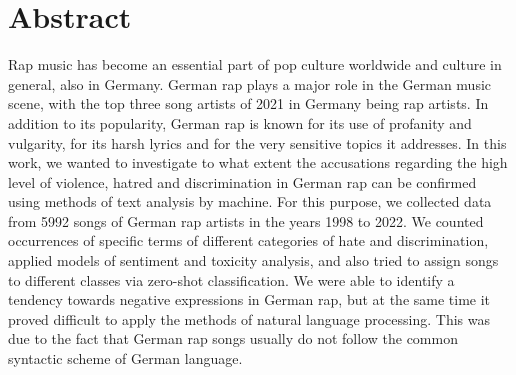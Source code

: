 \section*{Abstract}\label{sec:abstract}
Rap music has become an essential part of pop culture worldwide and culture in general, also in Germany. German rap plays a major role in the German music scene, with the top three song artists of 2021 in Germany being rap artists. In addition to its popularity, German rap is known for its use of profanity and vulgarity, for its harsh lyrics and for the very sensitive topics it addresses. In this work, we wanted to investigate to what extent the accusations regarding the high level of violence, hatred and discrimination in German rap can be confirmed using methods of text analysis by machine. For this purpose, we collected data from 5992 songs of German rap artists in the years 1998 to 2022. We counted occurrences of specific terms of different categories of hate and discrimination, applied models of sentiment and toxicity analysis, and also tried to assign songs to different classes via zero-shot classification. We were able to identify a tendency towards negative expressions in German rap, but at the same time it proved difficult to apply the methods of natural language processing. This was due to the fact that German rap songs usually do not follow the common syntactic scheme of German language.